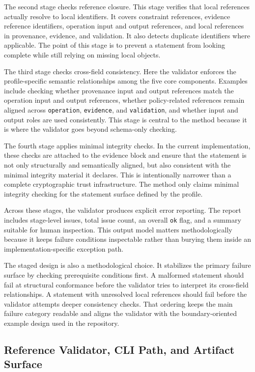 The second stage checks reference closure. This stage verifies that local references actually resolve to local identifiers. It covers constraint references, evidence reference identifiers, operation input and output references, and local references in provenance, evidence, and validation. It also detects duplicate identifiers where applicable. The point of this stage is to prevent a statement from looking complete while still relying on missing local objects.

The third stage checks cross-field consistency. Here the validator enforces the profile-specific semantic relationships among the five core components. Examples include checking whether provenance input and output references match the operation input and output references, whether policy-related references remain aligned across \texttt{operation}, \texttt{evidence}, and \texttt{validation}, and whether input and output roles are used consistently. This stage is central to the method because it is where the validator goes beyond schema-only checking.

The fourth stage applies minimal integrity checks. In the current implementation, these checks are attached to the evidence block and ensure that the statement is not only structurally and semantically aligned, but also consistent with the minimal integrity material it declares. This is intentionally narrower than a complete cryptographic trust infrastructure. The method only claims minimal integrity checking for the statement surface defined by the profile.

Across these stages, the validator produces explicit error reporting. The report includes stage-level issues, total issue count, an overall \texttt{ok} flag, and a summary suitable for human inspection. This output model matters methodologically because it keeps failure conditions inspectable rather than burying them inside an implementation-specific exception path.

The staged design is also a methodological choice. It stabilizes the primary failure surface by checking prerequisite conditions first. A malformed statement should fail at structural conformance before the validator tries to interpret its cross-field relationships. A statement with unresolved local references should fail before the validator attempts deeper consistency checks. That ordering keeps the main failure category readable and aligns the validator with the boundary-oriented example design used in the repository.

\subsection{Reference Validator, CLI Path, and Artifact Surface}

